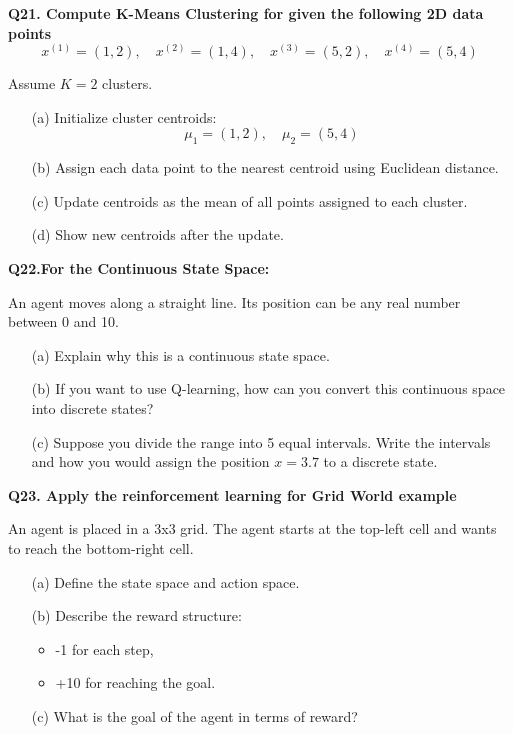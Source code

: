 \documentclass{article}
\begin{document}
\textbf{Q21. Compute K-Means Clustering for given the following 2D data points}
\[
x^{(1)} = (1, 2), \quad x^{(2)} = (1, 4), \quad x^{(3)} = (5, 2), \quad x^{(4)} = (5, 4)
\]

Assume  \( K = 2 \) clusters.

\begin{itemize}
    \item[(a)] Initialize cluster centroids:
    \[
    \mu_1 = (1, 2), \quad \mu_2 = (5, 4)
    \]

    \item[(b)] Assign each data point to the nearest centroid using Euclidean distance.

    \item[(c)] Update centroids as the mean of all points assigned to each cluster.

    \item[(d)] Show new centroids after the update.
\end{itemize}


\vspace{1\baselineskip}

\textbf {Q22.For the Continuous State Space: }

An agent moves along a straight line. Its position can be any real number between 0 and 10.

\begin{itemize}
    \item[(a)] Explain why this is a continuous state space.

    \item[(b)] If you want to use Q-learning, how can you convert this continuous space into discrete states?

    \item[(c)] Suppose you divide the range into 5 equal intervals. Write the intervals and how you would assign the position \( x = 3.7 \) to a discrete state.
\end{itemize}

\vspace{1\baselineskip}


\textbf{Q23. Apply the reinforcement learning for Grid World example }

An agent is placed in a 3x3 grid. The agent starts at the top-left cell and wants to reach the bottom-right cell.

\begin{itemize}
    \item[(a)] Define the state space and action space.
    \item[(b)] Describe the reward structure:
    \begin{itemize}
        \item -1 for each step,
        \item +10 for reaching the goal.
    \end{itemize}
    \item[(c)] What is the goal of the agent in terms of reward?
\end{itemize}
\end{document}
